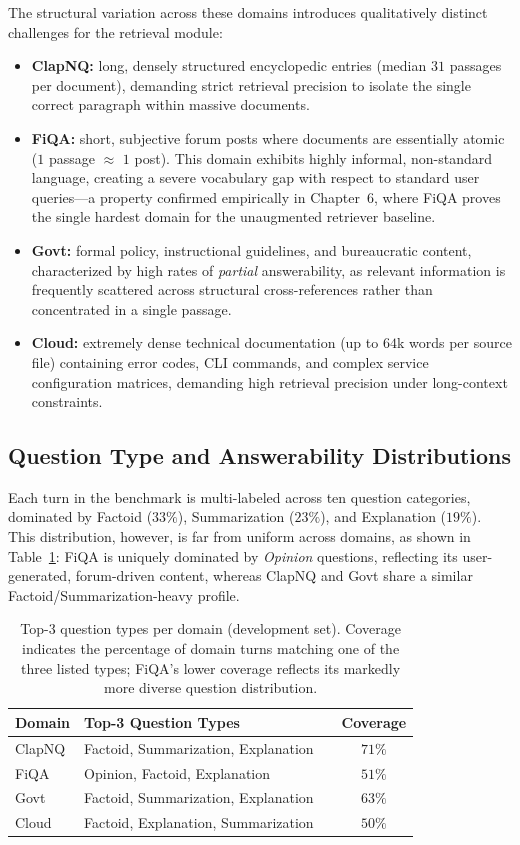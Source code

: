 The structural variation across these domains introduces qualitatively distinct challenges for the retrieval module:
\begin{itemize}
    \item \textbf{ClapNQ:} long, densely structured encyclopedic entries (median $31$ passages per document), demanding strict retrieval precision to isolate the single correct paragraph within massive documents.
    \item \textbf{FiQA:} short, subjective forum posts where documents are essentially atomic ($1$ passage $\approx$ $1$ post). This domain exhibits highly informal, non-standard language, creating a severe vocabulary gap with respect to standard user queries---a property confirmed empirically in Chapter~6, where FiQA proves the single hardest domain for the unaugmented retriever baseline.
    \item \textbf{Govt:} formal policy, instructional guidelines, and bureaucratic content, characterized by high rates of \textit{partial} answerability, as relevant information is frequently scattered across structural cross-references rather than concentrated in a single passage.
    \item \textbf{Cloud:} extremely dense technical documentation (up to $64$k words per source file) containing error codes, CLI commands, and complex service configuration matrices, demanding high retrieval precision under long-context constraints.
\end{itemize}

\subsection{Question Type and Answerability Distributions}

Each turn in the benchmark is multi-labeled across ten question categories, dominated by Factoid ($33\%$), Summarization ($23\%$), and Explanation ($19\%$). This distribution, however, is far from uniform across domains, as shown in Table~\ref{tab:question-type-en}: FiQA is uniquely dominated by \textit{Opinion} questions, reflecting its user-generated, forum-driven content, whereas ClapNQ and Govt share a similar Factoid/Summarization-heavy profile.

\begin{table}[h]
\centering
\small
\begin{tabular}{lll c}
\toprule
\textbf{Domain} & \textbf{Top-3 Question Types} & & \textbf{Coverage} \\
\midrule
ClapNQ & Factoid, Summarization, Explanation & & $71\%$ \\
FiQA & Opinion, Factoid, Explanation & & $51\%$ \\
Govt & Factoid, Summarization, Explanation & & $63\%$ \\
Cloud & Factoid, Explanation, Summarization & & $50\%$ \\
\bottomrule
\end{tabular}
\caption{Top-3 question types per domain (development set). Coverage indicates the percentage of domain turns matching one of the three listed types; FiQA's lower coverage reflects its markedly more diverse question distribution.}
\label{tab:question-type-en}
\end{table}

